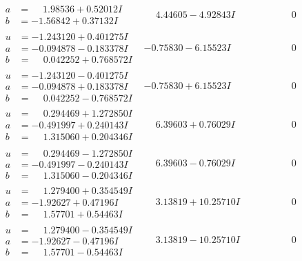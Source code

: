 \documentclass[1p]{elsarticle_modified}
\theoremstyle{definition}
\begin{document}
$$\begin{array}{c|c|c}
\begin{aligned}
a &= \phantom{-}1.98536 + 0.52012 I \\
b &= -1.56842 + 0.37132 I\end{aligned}
 & \phantom{-}4.44605 - 4.92843 I & \phantom{-0.000000 } 0 \\ \hline\begin{aligned}
u &= -1.243120 + 0.401275 I \\
a &= -0.094878 - 0.183378 I \\
b &= \phantom{-}0.042252 + 0.768572 I\end{aligned}
 & -0.75830 - 6.15523 I & \phantom{-0.000000 } 0 \\ \hline\begin{aligned}
u &= -1.243120 - 0.401275 I \\
a &= -0.094878 + 0.183378 I \\
b &= \phantom{-}0.042252 - 0.768572 I\end{aligned}
 & -0.75830 + 6.15523 I & \phantom{-0.000000 } 0 \\ \hline\begin{aligned}
u &= \phantom{-}0.294469 + 1.272850 I \\
a &= -0.491997 + 0.240143 I \\
b &= \phantom{-}1.315060 + 0.204346 I\end{aligned}
 & \phantom{-}6.39603 + 0.76029 I & \phantom{-0.000000 } 0 \\ \hline\begin{aligned}
u &= \phantom{-}0.294469 - 1.272850 I \\
a &= -0.491997 - 0.240143 I \\
b &= \phantom{-}1.315060 - 0.204346 I\end{aligned}
 & \phantom{-}6.39603 - 0.76029 I & \phantom{-0.000000 } 0 \\ \hline\begin{aligned}
u &= \phantom{-}1.279400 + 0.354549 I \\
a &= -1.92627 + 0.47196 I \\
b &= \phantom{-}1.57701 + 0.54463 I\end{aligned}
 & \phantom{-}3.13819 + 10.25710 I & \phantom{-0.000000 } 0 \\ \hline\begin{aligned}
u &= \phantom{-}1.279400 - 0.354549 I \\
a &= -1.92627 - 0.47196 I \\
b &= \phantom{-}1.57701 - 0.54463 I\end{aligned}
 & \phantom{-}3.13819 - 10.25710 I & \phantom{-0.000000 } 0\\

\end{array}$$
\end{document}
